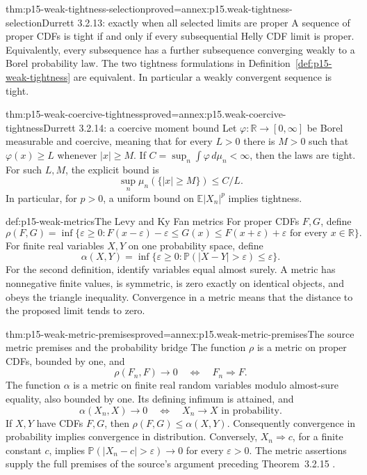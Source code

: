 \begin{hbtheorem}{thm:p15-weak-tightness-selection}{proved=annex:p15.weak-tightness-selection}{Durrett 3.2.13: exactly when all selected limits are proper}
A sequence of proper CDFs is tight if and only if every
subsequential Helly CDF limit is proper. Equivalently, every
subsequence has a further subsequence converging weakly to a
Borel probability law. The two tightness formulations in
Definition~\ref{def:p15-weak-tightness} are equivalent.
In particular a weakly convergent sequence is tight.
\end{hbtheorem}

\begin{hbtheorem}{thm:p15-weak-coercive-tightness}{proved=annex:p15.weak-coercive-tightness}{Durrett 3.2.14: a coercive moment bound}
Let \(\varphi:\mathbb R\to[0,\infty]\) be Borel measurable and
coercive, meaning that for every \(L>0\) there is \(M>0\) such
that \(\varphi(x)\geq L\) whenever \(|x|\geq M\).
If \(C=\sup_n\int\varphi\,d\mu_n<\infty\), then the laws are tight.
For such \(L,M\), the explicit bound is
\[
 \sup_n\mu_n(\{|x|\geq M\})\leq C/L.
\]
In particular, for \(p>0\), a uniform bound on
\(\mathbb E|X_n|^p\) implies tightness.
\end{hbtheorem}

\begin{hbdefinition}{def:p15-weak-metrics}{The Levy and Ky Fan metrics}
For proper CDFs \(F,G\), define
\[
 \rho(F,G)=\inf\{\varepsilon\geq0:
 F(x-\varepsilon)-\varepsilon\leq G(x)
 \leq F(x+\varepsilon)+\varepsilon
                         \text{ for every }x\in\mathbb R\}.
\]
For finite real variables \(X,Y\) on one probability space, define
\[
 \alpha(X,Y)=\inf\{\varepsilon\geq0:
                   \mathbb P(|X-Y|>\varepsilon)\leq\varepsilon\}.
\]
For the second definition, identify variables equal almost surely.
A metric has nonnegative finite values, is symmetric, is zero
exactly on identical objects, and obeys the triangle inequality.
Convergence in a metric means that the distance to the proposed
limit tends to zero.
\end{hbdefinition}

\begin{hbtheorem}{thm:p15-weak-metric-premises}{proved=annex:p15.weak-metric-premises}{The source metric premises and the probability bridge}
The function \(\rho\) is a metric on proper CDFs, bounded by one,
and
\[
 \rho(F_n,F)\to0\quad\Longleftrightarrow\quad F_n\Rightarrow F.
\]
The function \(\alpha\) is a metric on finite real random
variables modulo almost-sure equality, also bounded by one.
Its defining infimum is attained, and
\[
 \alpha(X_n,X)\to0
       \quad\Longleftrightarrow\quad X_n\to X\text{ in probability}.
\]
If \(X,Y\) have CDFs \(F,G\), then
\(\rho(F,G)\leq\alpha(X,Y)\).
Consequently convergence in probability implies convergence in
distribution. Conversely, \(X_n\Rightarrow c\), for a finite
constant \(c\), implies
\(\mathbb P(|X_n-c|>\varepsilon)\to0\) for every \(\varepsilon>0\).
The metric assertions supply the full premises of the source's
argument preceding Theorem~3.2.15
\cite[Exercises~3.2.6--3.2.7 and 3.2.12, pp.~124--125]{DurrettPTEAuthor2019}.
\end{hbtheorem}


